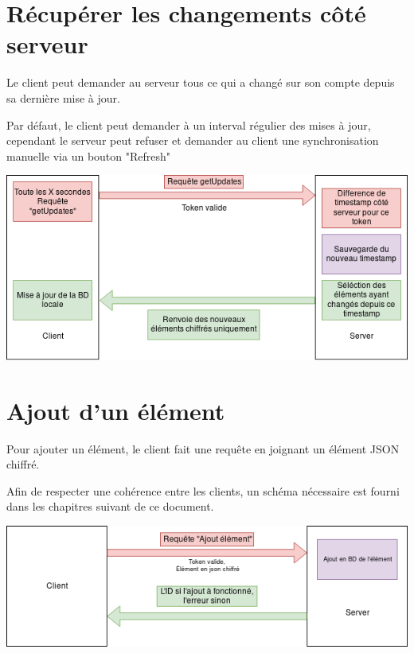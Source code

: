 \documentclass[oneside]{report}
\begin{document}
	\section{Récupérer les changements côté serveur}{
		\par Le client peut demander au serveur tous ce qui a changé sur son compte depuis sa dernière mise à jour.
		\par Par défaut, le client peut demander à un interval régulier des mises à jour, cependant le serveur peut refuser et demander au client une synchronisation manuelle via un bouton "Refresh"
		\begin{center}
			\includegraphics[scale=.5]{reseau_getupdates}
		\end{center}
	}

	\section{Ajout d'un élément}{
		\par Pour ajouter un élément, le client fait une requête en joignant un élément JSON chiffré.
		\par Afin de respecter une cohérence entre les clients, un schéma nécessaire est fourni dans les chapitres suivant de ce document.
		\begin{center}
			\includegraphics[scale=.5]{reseau_add_elt}
		\end{center}

	}
\end{document}
